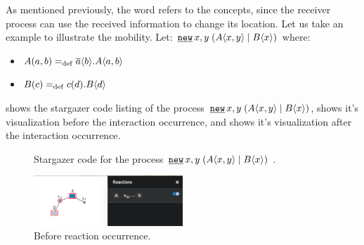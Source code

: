 As mentioned previously, the word  refers to the  concepts, since the receiver process can use the received information to change its location. Let us take an example to illustrate the mobility. Let: $\procres{x,y}{(\procpar{\proccall{A}{x,y}}{\proccall{B}{x}})}$ where:
\begin{itemize}
\item $A(a,b)=_{\mathrm{def}}{}\overline{a}\langle{b}\rangle.A\langle a,b\rangle$
\item $B(c)=_{\mathrm{def}}{}c({d}).B\langle d\rangle$
\end{itemize}


 shows the stargazer code listing of the process $\procres{x,y}{(\procpar{\proccall{A}{x,y}}{\proccall{B}{x}})}$,   shows it's visualization before the interaction occurrence, and  shows it's visualization after the interaction occurrence.
\begin{figure}[ht!]

\caption{Stargazer code for the process $\procres{x,y}{(\procpar{\proccall{A}{x,y}}{\proccall{B}{x}})}$ .}
\label{pi_mobility_stargazer_code}
\end{figure}

\begin{figure}[ht!]
	\centering
	\includegraphics[width=0.5\textwidth]{./images/pi_mobility_stargazer_Before_react.png}
	\caption{Before reaction occurrence.}
	\label{pi_mobility_stargazer_Before_react}
\end{figure}

